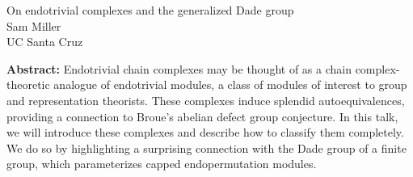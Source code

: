 \documentclass[12pt,a4paper]{article}
\begin{document}
\thispagestyle{empty} 
\begin{center}
{\large  On endotrivial complexes and the generalized Dade group}\\
\vspace*{.5cm}
Sam Miller\\
UC Santa Cruz\\
\end{center}
\vspace*{.8cm}

{\bf Abstract:} Endotrivial chain complexes may be thought of as a chain complex-theoretic analogue of endotrivial modules, a class of modules of interest to group and representation theorists. These complexes induce splendid autoequivalences, providing a connection to Broue's abelian defect group conjecture. In this talk, we will introduce these complexes and describe how to classify them completely. We do so by highlighting a surprising connection with the Dade group of a finite group, which parameterizes capped endopermutation modules. 
\end{document}
